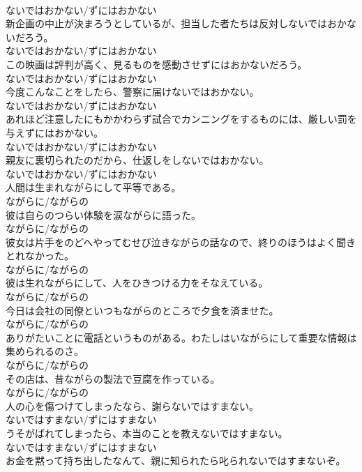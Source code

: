 \documentclass[8pt]{extreport}
\begin{document}
\begin{CJK}{UTF8}{min}
\\	ないではおかない/ずにはおかない
\\	新企画の中止が決まろうとしているが、担当した者たちは反対しないではおかないだろう。	
\\	ないではおかない/ずにはおかない
\\	この映画は評判が高く、見るものを感動させずにはおかないだろう。	
\\	ないではおかない/ずにはおかない
\\	今度こんなことをしたら、警察に届けないではおかない。	
\\	ないではおかない/ずにはおかない
\\	あれほど注意したにもかかわらず試合でカンニングをするものには、厳しい罰を与えずにはおかない。	
\\	ないではおかない/ずにはおかない
\\	親友に裏切られたのだから、仕返しをしないではおかない。	
\\	ないではおかない/ずにはおかない
\\	人間は生まれながらにして平等である。	
\\	ながらに/ながらの
\\	彼は自らのつらい体験を涙ながらに語った。	
\\	ながらに/ながらの
\\	彼女は片手をのどへやってむせび泣きながらの話なので、終りのほうはよく聞きとれなかった。	
\\	ながらに/ながらの
\\	彼は生れながらにして、人をひきつける力をそなえている。	
\\	ながらに/ながらの
\\	今日は会社の同僚といつもながらのところで夕食を済ませた。	
\\	ながらに/ながらの
\\	ありがたいことに電話というものがある。わたしはいながらにして重要な情報は集められるのさ。	
\\	ながらに/ながらの
\\	その店は、昔ながらの製法で豆腐を作っている。	
\\	ながらに/ながらの
\\	人の心を傷つけてしまったなら、謝らないではすまない。	
\\	ないではすまない/ずにはすまない
\\	うそがばれてしまったら、本当のことを教えないではすまない。	
\\	ないではすまない/ずにはすまない
\\	お金を黙って持ち出したなんて、親に知られたら叱られないではすまないぞ。	

\end{CJK}
\end{document}
